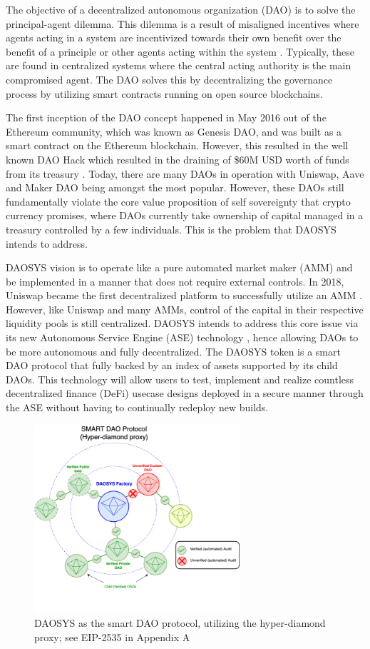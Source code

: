 \documentclass[journal,twocolumn,12pt]{ieeesyscoin}
\begin{document}
The objective of a decentralized autonomous organization (DAO) is to solve the principal-agent dilemma. This dilemma is a result of misaligned incentives where agents acting in a system are incentivized towards their own benefit over the benefit of a principle or other agents acting within the system \cite{San83}. Typically, these are found in centralized systems where the central acting authority is the main compromised agent. The DAO solves this by decentralizing the governance process by utilizing smart contracts running on open source blockchains.

The first inception of the DAO concept happened in May 2016 out of the Ethereum community, which was known as Genesis DAO, and was built as a smart contract on the Ethereum blockchain. However, this resulted in the well known DAO Hack which resulted in the draining of \$60M USD worth of funds from its treasury \cite{Sie22}. Today, there are many DAOs in operation with Uniswap, Aave and Maker DAO being amongst the most popular. However, these DAOs still fundamentally violate the core value proposition of self sovereignty that crypto currency promises, where DAOs currently take ownership of capital managed in a treasury controlled by a few individuals. This is the problem that DAOSYS intends to address.

DAOSYS vision is to operate like a pure automated market maker (AMM) and be implemented in a manner that does not require external controls. In 2018, Uniswap became the first decentralized platform to successfully utilize an AMM \cite{Uni19}. However, like Uniswap and many AMMs, control of the capital in their respective liquidity pools is still centralized. DAOSYS intends to address this core issue via its new Autonomous Service Engine (ASE) technology \cite{Sys22}, hence allowing DAOs to be more autonomous and fully decentralized. The DAOSYS token is a smart DAO protocol that fully backed by an index of assets supported by its child DAOs. This technology will allow users to test, implement and realize countless decentralized finance (DeFi) usecase designs deployed in a secure manner through the ASE without having to continually redeploy new builds.

\begin{figure}[h!]
\includegraphics[width=3in]{img/smart_dao.png}
\caption{DAOSYS as the smart DAO protocol, utilizing the hyper-diamond proxy; see EIP-2535 in Appendix A} 
\label{fig:daosys_governance}
\end{figure}
\end{document}
